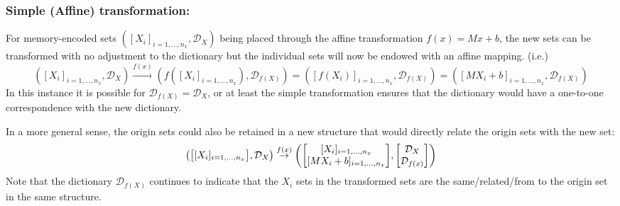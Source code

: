 \documentclass[11pt]{article}
\newcommand{\Rel}{\ \mathcal{R} \ }
\newcommand{\V}{\mathbb{V}} %
\newcommand{\Key}{\nu} %
\newcommand{\Dict}{\mathcal{D}} %
\begin{document}





\subsubsection{Simple (Affine) transformation:}
For memory-encoded sets $([X_{i}]_{i=1,\dots,n_x},\Dict_{X})$ being placed through the affine transformation $f(x) = Mx + b$, the new sets can be transformed with no adjustment to the dictionary but the individual sets will now be endowed with an affine mapping.
(i.e.)\[
	([X_{i}]_{i=1,\dots,n_x},\Dict_{X}) 
	\overset{f(x)}{\rightarrow} 
	(f([X_{i}]_{i=1,\dots,n_x}),\Dict_{f(X)})
	= ([f(X_{i})]_{i=1,\dots,n_x},\Dict_{f(X)})
	= ([M X_{i} + b]_{i=1,\dots,n_x},\Dict_{f(X)})
\]
In this instance it is possible for $\Dict_{f(X)} = \Dict_{X}$, or at least the simple transformation ensures that the dictionary would have a one-to-one correspondence with the new dictionary.

In a more general sense, the origin sets could also be retained in a new structure that would directly relate the origin sets with the new set:
\[
	\qty(\mqty[[X_{i}]_{i=1,\dots,n_x}], \Dict_{X})
	\overset{f(x)}{\rightarrow} 
	\qty(\mqty[
		[X_{i}]_{i=1,\dots,n_x}\\
		[M X_{i} + b]_{i=1,\dots,n_x}], 
	\mqty[\Dict_{X}\\ \Dict_{f(x)}]
		)
\]
Note that the dictionary $\Dict_{f(X)}$ continues to indicate that the $X_{i}$ sets in the transformed sets are the same/related/from to the origin set in the same structure.
\end{document}

